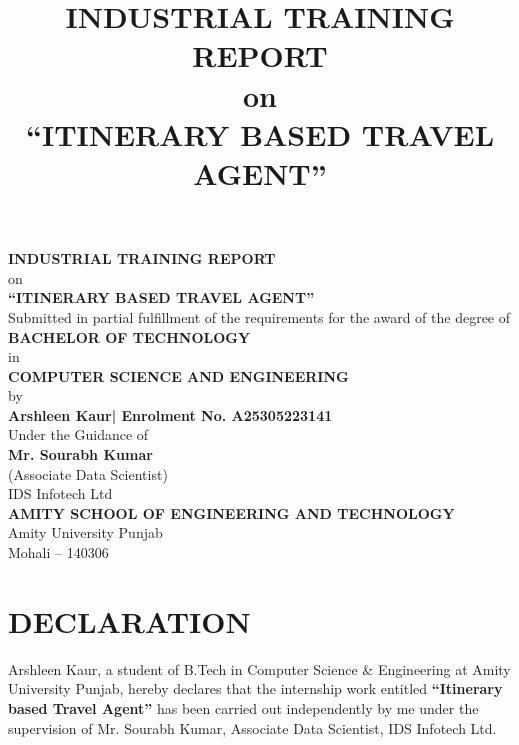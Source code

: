 \documentclass[12pt,a4paper]{report}
\title{\textbf{INDUSTRIAL TRAINING REPORT}\\[0.5cm]
on\\[0.5cm]
\textbf{``ITINERARY BASED TRAVEL AGENT''}}
\author{}
\date{}
\begin{document}
\maketitle

\newpage
\thispagestyle{empty}
\begin{center}
    \vspace*{1cm}
    {\Large \textbf{INDUSTRIAL TRAINING REPORT}}\\[0.8cm]
    {\large on}\\[0.8cm]
    {\Large \textbf{``ITINERARY BASED TRAVEL AGENT''}}\\[1.5cm]

    Submitted in partial fulfillment of the requirements for the award of the degree of\\[0.3cm]
    {\large \textbf{BACHELOR OF TECHNOLOGY}}\\[0.3cm]
    in\\[0.3cm]
    {\large \textbf{COMPUTER SCIENCE AND ENGINEERING}}\\[1cm]

    by\\[0.3cm]
    {\large \textbf{Arshleen Kaur| Enrolment No. A25305223141}}\\[1.5cm]

    Under the Guidance of\\[0.3cm]
    {\large \textbf{Mr. Sourabh Kumar}}\\[0.1cm]
    (Associate Data Scientist)\\[0.1cm]
    IDS Infotech Ltd\\[1.5cm]

    {\large \textbf{AMITY SCHOOL OF ENGINEERING AND TECHNOLOGY}}\\[0.1cm]
    {\large Amity University Punjab}\\[0.1cm]
    {\large Mohali -- 140306}\\[1cm]

    
\end{center}

\newpage
\thispagestyle{empty}

\clearpage

\chapter*{DECLARATION}
\label{sec:declaration}

Arshleen Kaur, a student of B.Tech in Computer Science \& Engineering at Amity University Punjab, hereby declares that the internship work entitled \textbf{``Itinerary based Travel Agent''} has been carried out independently by me under the supervision of Mr. Sourabh Kumar, Associate Data Scientist, IDS Infotech Ltd. 
\end{document}
